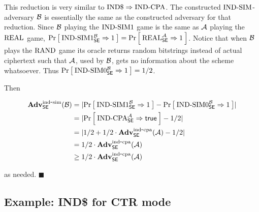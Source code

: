 This reduction is very similar to $\INDRAND \Rightarrow \INDCPA$.  The
constructed $\INDSIM$-adversary $\advB$ is essentially the same as the
constructed adversary for that reduction. Since $\advB$ playing the $\INDSIM1$
game is the same as $\advA$ playing the $\RORreal$ game,
$\Prob{\INDSIM1_{\SE}^{\advB} \Rightarrow 1} = \Prob{\RORreal_{\SE}^{\advA} \Rightarrow 1}$.
Notice that when $\advB$ plays the $\RORrand$ game its oracle returns random
bitstrings instead of actual ciphertext such that $\advA$, used by $\advB$,
gets no information about the scheme whatsoever.  Thus
$\Prob{\INDSIM0_{\SEscheme}^{\advB} \Rightarrow 1} = 1/2$.

Then

\begin{align*}
  \AdvINDSIM{\SEscheme}{\advB} &=
    \absv{\Prob{\INDSIM1^{\advB}_{\SEscheme} \Rightarrow 1} -
          \Prob{\INDSIM0^{\advB}_{\SEscheme} \Rightarrow 1}} \\
  &= \absv{\Prob{\INDCPA^{\advA}_{\SEscheme} \Rightarrow \true} - 1 / 2} \\
  &= \absv{1 / 2 + 1 / 2 \cdot \AdvINDCPA{\SEscheme}{\advA} - 1 / 2} \\
  &= 1 / 2 \cdot \AdvINDCPA{\SEscheme}{\advA} \\
  &\geq 1 / 2 \cdot \AdvINDCPA{\SEscheme}{\advA}
\end{align*}

as needed. $\blacksquare$

\subsection{Example: IND\$ for CTR mode}


